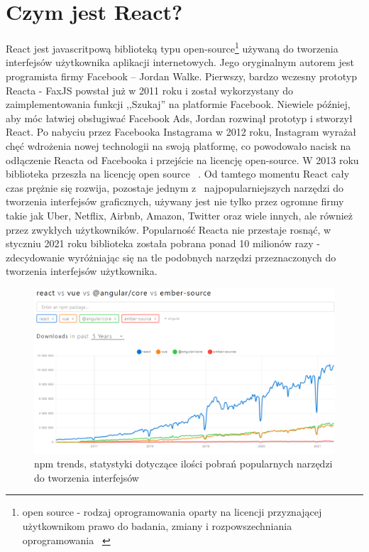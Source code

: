 \documentclass[oneside,polski,logo,indent]{amuthesis}
\begin{document}
\section{Czym jest React?}
{
React jest javascritpową biblioteką typu open-source\footnote{open source - rodzaj oprogramowania oparty na licencji przyznającej użytkownikom prawo do badania, zmiany i rozpowszechniania oprogramowania ~\cite{opensourcewiki}} używaną do tworzenia interfejsów użytkownika aplikacji internetowych. Jego oryginalnym autorem jest programista firmy Facebook -- Jordan Walke. Pierwszy, bardzo wczesny prototyp Reacta - FaxJS powstał już w 2011 roku i został wykorzystany do zaimplementowania funkcji ,,Szukaj'' na platformie Facebook. Niewiele później, aby móc łatwiej obsługiwać Facebook Ads, Jordan rozwinął prototyp i stworzył React. Po nabyciu przez Facebooka Instagrama w 2012 roku, Instagram wyrażał chęć wdrożenia nowej technologii na swoją platformę, co powodowało nacisk na odłączenie Reacta od Facebooka i przejście na licencję open-source. W 2013 roku biblioteka przeszła na licencję open source ~\cite{reactstory}. 
Od tamtego momentu React cały czas prężnie się rozwija, pozostaje jednym z~ najpopularniejszych narzędzi do tworzenia interfejsów graficznych, używany jest nie tylko przez ogromne firmy takie jak Uber, Netflix, Airbnb, Amazon, Twitter oraz wiele innych, ale również przez zwykłych użytkowników. Popularność Reacta nie przestaje rosnąć, w styczniu 2021 roku biblioteka została pobrana ponad 10 milionów razy - zdecydowanie wyróżniając się na tle podobnych narzędzi przeznaczonych do tworzenia interfejsów użytkownika.
\begin{figure}
\centering
\includegraphics[width=14cm]{statystyki react vue angular.png}
\caption{npm trends, statystyki dotyczące ilości pobrań popularnych narzędzi do tworzenia interfejsów}
\label{statystyki react vue angular.png}
\end{figure}
}
\end{document}
